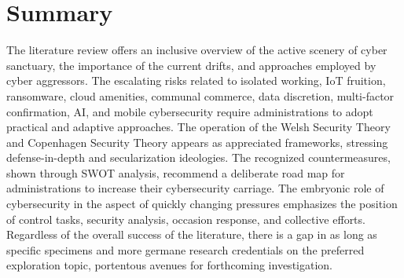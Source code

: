 \section{Summary}
\label{sec:into_back}
The literature review offers an inclusive overview of the active scenery of cyber sanctuary, the importance of the current drifts, and approaches employed by cyber aggressors. The escalating risks related to isolated working, IoT fruition, ransomware, cloud amenities, communal commerce, data discretion, multi-factor confirmation, AI, and mobile cybersecurity require administrations to adopt practical and adaptive approaches. The operation of the Welsh Security Theory and Copenhagen Security Theory appears as appreciated frameworks, stressing defense-in-depth and secularization ideologies. The recognized countermeasures, shown through SWOT analysis, recommend a deliberate road map for administrations to increase their cybersecurity carriage. The embryonic role of cybersecurity in the aspect of quickly changing pressures emphasizes the position of control tasks, security analysis, occasion response, and collective efforts. Regardless of the overall success of the literature, there is a gap in as long as specific specimens and more germane research credentials on the preferred exploration topic, portentous avenues for forthcoming investigation.


